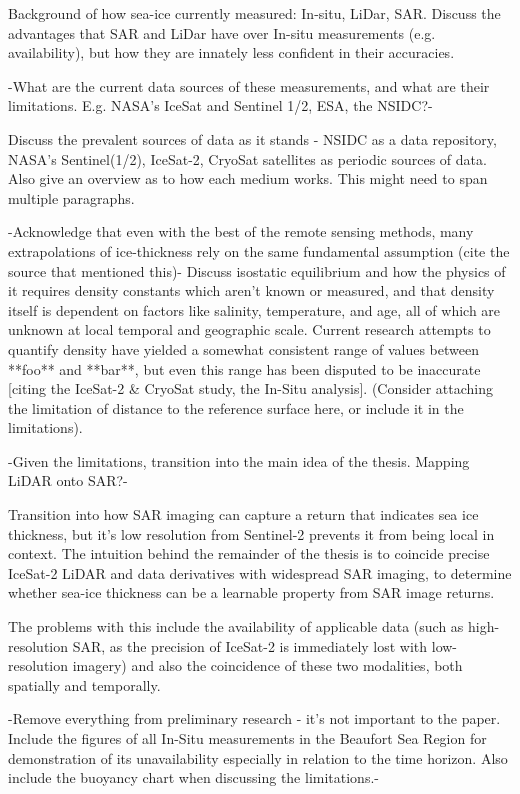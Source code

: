 Background of how sea-ice currently measured: In-situ, LiDar, SAR. Discuss the advantages that SAR and LiDar have over In-situ measurements (e.g. availability), but how they are innately less confident in their accuracies.

-What are the current data sources of these measurements, and what are their limitations. E.g. NASA's IceSat and Sentinel 1/2, ESA, the NSIDC?- 

\indent Discuss the prevalent sources of data as it stands - NSIDC as a data repository, NASA's Sentinel(1/2), IceSat-2, CryoSat satellites as periodic sources of data. Also give an overview as to how each medium works. This might need to span multiple paragraphs.


-Acknowledge that even with the best of the remote sensing methods, many extrapolations of ice-thickness rely on the same fundamental assumption (cite the source that mentioned this)-
Discuss isostatic equilibrium and how the physics of it requires density constants which aren't known or measured, and that density itself is dependent on factors like salinity, temperature, and age, all of which are unknown at local temporal and geographic scale. Current research attempts to quantify density have yielded a somewhat consistent range of values between **foo** and **bar**, but even this range has been disputed to be inaccurate [citing the IceSat-2 \& CryoSat study, the In-Situ analysis]. (Consider attaching the limitation of distance to the reference surface here, or include it in the limitations).

-Given the limitations, transition into the main idea of the thesis. Mapping LiDAR onto SAR?- 

Transition into how SAR imaging can capture a return that indicates sea ice thickness, but it's low resolution from Sentinel-2 prevents it from being local in context. The intuition behind the remainder of the thesis is to coincide precise IceSat-2 LiDAR and data derivatives with widespread SAR imaging, to determine whether sea-ice thickness can be a learnable property from SAR image returns.

The problems with this include the availability of applicable data (such as high-resolution SAR, as the precision of IceSat-2 is immediately lost with low-resolution imagery) and also the coincidence of these two modalities, both spatially and temporally.

-Remove everything from preliminary research - it's not important to the paper. Include the figures of all In-Situ measurements in the Beaufort Sea Region for demonstration of its unavailability especially in relation to the time horizon. Also include the buoyancy chart when discussing the limitations.-
\par


